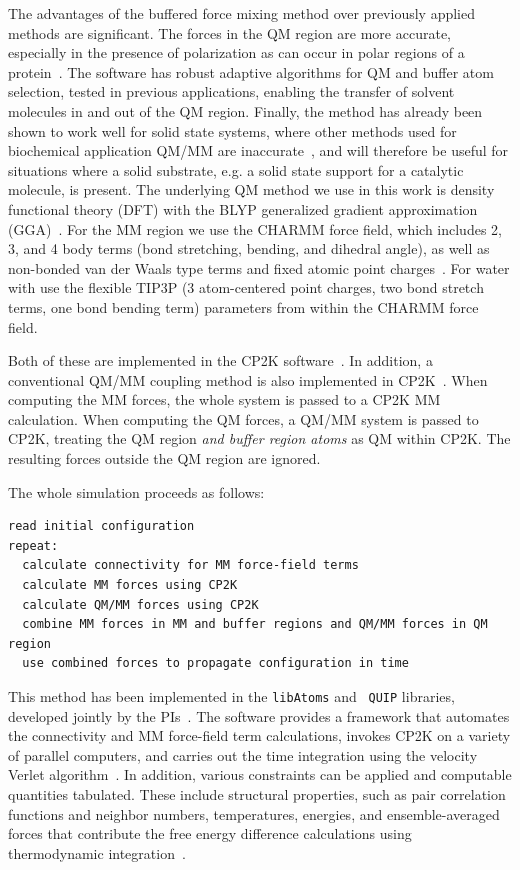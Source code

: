 \documentclass[11pt]{revtex4}
\begin{document}
The advantages of the buffered force mixing method over previously
applied methods are significant.  The forces in the QM region are
more accurate, especially in the presence of polarization as can
occur in polar regions of a protein~\cite{solt_j_phys_chem_b_2009a}.
The software has robust adaptive algorithms for QM and buffer atom
selection, tested in previous applications, enabling the transfer
of solvent molecules in and out of the QM region.  Finally, the
method has already been shown to work well for solid state systems,
where other methods used for biochemical application QM/MM are
inaccurate~\cite{bernstein_rep_prog_phys_2009a}, and will therefore
be useful for situations where a solid substrate, e.g. a solid state
support for a catalytic molecule, is present.  The underlying QM
method we use in this work is density functional theory (DFT) with
the BLYP generalized gradient approximation
(GGA)~\cite{kohn_phys_rev_1965a,becke_phys_rev_a_1988a,lee_phys_rev_b_1988a}.
For the MM region we use the CHARMM force field, which includes 2,
3, and 4 body terms (bond stretching, bending, and dihedral angle),
as well as non-bonded van der Waals type terms and fixed atomic
point charges~\cite{brooks_j_comp_chem_2009a}.  For water with use
the flexible TIP3P (3 atom-centered point charges, two bond stretch terms, one
bond bending term) parameters from within the CHARMM force field.

Both of these are implemented in the CP2K
software~\cite{vandevondele_comp_phys_comm_2005a,laino_j_chem_theor_comp_2006a,cp2k_web}.
In addition, a conventional QM/MM coupling method is also implemented
in CP2K~\cite{laio_j_chem_phys_2002a}.  When computing the MM forces,
the whole system is passed to a CP2K MM calculation.  When computing
the QM forces, a QM/MM system is passed to CP2K, treating the QM
region {\em and buffer region atoms} as QM within CP2K.  The resulting
forces outside the QM region are ignored.

The whole simulation proceeds as follows:
\begin{verbatim}
read initial configuration
repeat:
  calculate connectivity for MM force-field terms
  calculate MM forces using CP2K
  calculate QM/MM forces using CP2K
  combine MM forces in MM and buffer regions and QM/MM forces in QM region
  use combined forces to propagate configuration in time
\end{verbatim}
This method has been implemented in the {\tt libAtoms} and {\tt
QUIP} libraries, developed jointly by the PIs~\cite{libatoms_web}.
The software provides a framework that automates the connectivity
and MM force-field term calculations, invokes CP2K on a variety of
parallel computers, and carries out the time integration using the
velocity Verlet algorithm~\cite{frenkel_2002a}.  In addition, various
constraints can be applied and computable quantities tabulated.
These include structural properties, such as pair correlation
functions and neighbor numbers, temperatures, energies, and
ensemble-averaged forces that contribute the free energy difference
calculations using thermodynamic integration~\cite{frenkel_2002b}.
\end{document}
